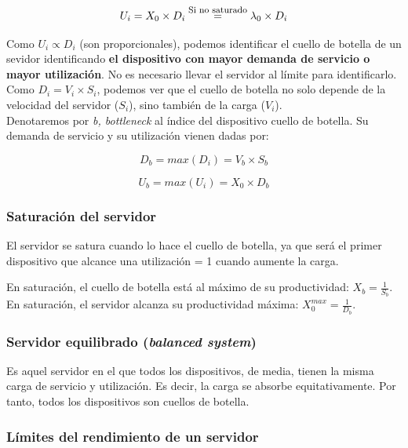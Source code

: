 \documentclass[12pt,spanish]{article}
\begin{document}
\begin{equation*}
	U_i=X_0 \times D_i \stackrel{\text{\footnotesize{Si no saturado}}}{=} \lambda_0 \times D_i
\end{equation*}

Como $U_i \propto D_i$ (son proporcionales), podemos identificar el cuello de botella de un sevidor identificando \textbf{el dispositivo con mayor demanda de servicio o mayor utilización}. No es necesario llevar el servidor al límite para identificarlo.\\

Como $D_i=V_i \times S_i$, podemos ver que el cuello de botella no solo depende de la velocidad del servidor ($S_i$), sino también de la carga ($V_i$).\\

Denotaremos por \textit{b, bottleneck} al índice del dispositivo cuello de botella. Su demanda de servicio y su utilización vienen dadas por:

\begin{equation*}
	D_b=max(D_i) = V_b \times S_b
\end{equation*}

\begin{equation*}
	U_b=max(U_i)=X_0 \times D_b
\end{equation*}

\subsubsection{Saturación del servidor}

El servidor se satura cuando lo hace el cuello de botella, ya que será el primer dispositivo que alcance una utilización = 1 cuando aumente la carga.

En saturación, el cuello de botella está al máximo de su productividad: $X_b=\frac{1}{S_b}$.\\
En saturación, el servidor alcanza su productividad máxima: $X_0^{max}=\frac{1}{D_b}$.

\subsubsection{Servidor equilibrado (\textit{balanced system})}

Es aquel servidor en el que todos los dispositivos, de media, tienen la misma carga de servicio y utilización. Es decir, la carga se absorbe equitativamente. Por tanto, todos los dispositivos son cuellos de botella.

\subsubsection{Límites del rendimiento de un servidor}
\end{document}
